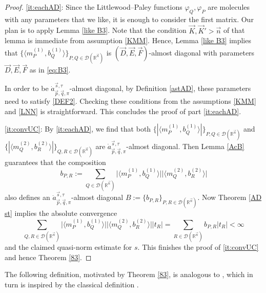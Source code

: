 \documentclass[11pt, reqno]{amsart}
\theoremstyle{definition}
\theoremstyle{remark}
\numberwithin{equation}{section}
\newcommand{\vD}{\vec D}
\newcommand{\vE}{\vec E}
\newcommand{\vF}{\vec F}
\newcommand{\R}{\mathbb R}
\newcommand{\vn}{\vec n}
\newcommand{\vp}{\vec p}
\newcommand{\vq}{\vec q}
\newcommand{\vs}{\vec s}
\newcommand{\atau}{\dot a^{\vs,\tau}_{\vp,\vq,\pi}}
\newcommand{\pair}[2]{\langle #1, #2 \rangle}
\begin{document}
\begin{proof}
\eqref{it:eachAD}: Since the Littlewood--Paley functions $\varphi_Q,\varphi_P$ are molecules with any parameters that we like, it is enough to consider the first matrix. Our plan is to apply Lemma \ref{like B3}. Note that the condition $\vec K,\vec K'>\vn$ of that lemma is immediate from assumption \eqref{KMM}. Hence, Lemma \ref{like B3} implies that
$\{ \pair{ m_P^{(1)} }{ b_Q^{(1)} }\}_{P,Q\in\mathscr D(\R^{\vn})}$ is $(\vD,\vE,\vF)$-almost diagonal with parameters $\vD,\vE,\vF$ as in \eqref{eq:B3}.

In order to be $\atau$-almost diagonal, by Definition \ref{astAD}, these parameters need to satisfy \eqref{DEF2}. Checking these conditions from the
assumptions \eqref{KMM} and \eqref{LNN} is straightforward.
This concludes the proof of part \eqref{it:eachAD}.

\eqref{it:convUC}:
By \eqref{it:eachAD}, we find that both
$\{|\langle m_P^{(1)}, b_Q^{(1)}\rangle|\}_{P,Q\in\mathscr D(\R^{\vn})}$
and $\{|\langle m_Q^{(2)}, b_R^{(2)}\rangle|\}_{Q,R\in\mathscr D(\R^{\vn})}$
are $\dot a^{\vec s,\tau}_{\vec p,\vec q,\pi}$-almost diagonal.
Then Lemma \ref{AcB} guarantees that the composition
\begin{equation*}
b_{P,R}:=\sum_{Q\in\mathscr D(\R^{\vn})}
\Big|\langle m_P^{(1)},b_Q^{(1)}\rangle\Big|
\Big|\langle m_Q^{(2)}, b_R^{(2)}\rangle\Big|
\end{equation*}
also defines an
$\dot a^{\vec s,\tau}_{\vec p,\vec q,\pi}$-almost diagonal
$B:=\{b_{P,R}\}_{P,R\in\mathscr D(\R^{\vn})}$.
Now Theorem \ref{AD st} implies the absolute convergence
\begin{equation*}
\sum_{Q,R\in\mathscr D(\R^{\vn})}
\Big|\Big\langle m_P^{(1)},b_Q^{(1)}\Big\rangle\Big|
\Big|\Big\langle m_Q^{(2)}, b_R^{(2)}\Big\rangle\Big|
|t_R|
=\sum_{R\in\mathscr D(\R^{\vn})}b_{P,R}|t_R|<\infty
\end{equation*}
and the claimed quasi-norm estimate for $s$.
This finishes the proof of \eqref{it:convUC} and hence Theorem \ref{83}.
\end{proof}

The following definition, motivated by Theorem \ref{83}, is analogous to \cite[Definition 3.10]{BHYY:1c}, which in turn is inspired by the classical definition \cite[pp.~56--57]{FJ90}.
\end{document}
